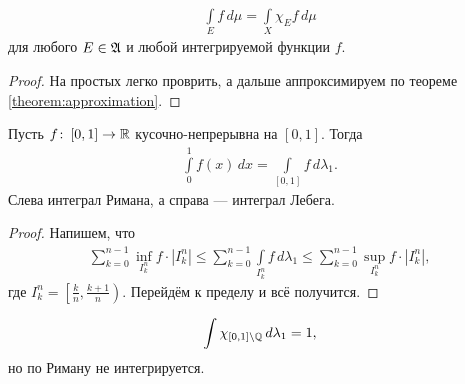 \begin{remrk}
 \begin{align*}
  \int\limits_E f\,d\mu = \int\limits_X \chi_E f \,d\mu
 \end{align*} для любого $E \in \mathfrak{A}$ и любой интегрируемой функции $f$.
\end{remrk}
\begin{proof}
 На простых легко проврить, а дальше аппроксимируем по теореме \ref{theorem:approximation}.
\end{proof}
\begin{claim}
 Пусть $f \colon\, [0,1] \to \mathbb{R}  $ кусочно-непрерывна на $[0,1]$. Тогда \begin{align*}
  \int\limits_{0}^{1} f(x) \, dx = \int\limits_{[0,1]} f \, d\lambda_1
 .\end{align*}  Слева интеграл Римана, а справа --- интеграл Лебега.
\end{claim}
\begin{proof}
 Напишем, что \begin{align*}
  \sum_{k=0}^{n - 1} \inf_{I_k^{n}} f \cdot \left| I_k^{n} \right| \leqslant \sum_{k=0}^{n - 1} \int\limits_{I_k^{n}} f \, d\lambda_1 \leqslant \sum_{k=0}^{n - 1} \sup_{I_k^{n}} f \cdot \left| I_k^{n} \right|
 ,\end{align*}  где $I_k^{n} = \left[ \frac{k}{n}, \frac{k+1}{n} \right)$. Перейдём к пределу и всё получится.
\end{proof}
\begin{remrk}
 \begin{align*}
  \int\limits \chi_{[0,1] \setminus \mathbb{Q}} \, d\lambda_1 = 1
 ,\end{align*} но по Риману не интегрируется.
\end{remrk}
